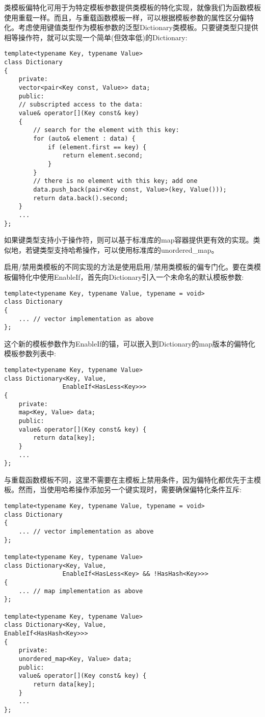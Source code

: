 
类模板偏特化可用于为特定模板参数提供类模板的特化实现，就像我们为函数模板使用重载一样。而且，与重载函数模板一样，可以根据模板参数的属性区分偏特化。考虑使用键值类型作为模板参数的泛型Dictionary类模板。只要键类型只提供相等操作符，就可以实现一个简单(但效率低)的Dictionary:

\begin{lstlisting}[style=styleCXX]
template<typename Key, typename Value>
class Dictionary
{
	private:
	vector<pair<Key const, Value>> data;
	public:
	// subscripted access to the data:
	value& operator[](Key const& key)
	{
		// search for the element with this key:
		for (auto& element : data) {
			if (element.first == key) {
				return element.second;
			}
		}
		// there is no element with this key; add one
		data.push_back(pair<Key const, Value>(key, Value()));
		return data.back().second;
	}
	...
};
\end{lstlisting}

如果键类型支持小于操作符，则可以基于标准库的map容器提供更有效的实现。类似地，若键类型支持哈希操作，可以使用标准库的unordered\_map。


启用/禁用类模板的不同实现的方法是使用启用/禁用类模板的偏专门化。要在类模板偏特化中使用EnableIf，首先向Dictionary引入一个未命名的默认模板参数:

\begin{lstlisting}[style=styleCXX]
template<typename Key, typename Value, typename = void>
class Dictionary
{
	... // vector implementation as above
};
\end{lstlisting}

这个新的模板参数作为EnableIf的锚，可以嵌入到Dictionary的map版本的偏特化模板参数列表中:

\begin{lstlisting}[style=styleCXX]
template<typename Key, typename Value>
class Dictionary<Key, Value,
				EnableIf<HasLess<Key>>>
{
	private:
	map<Key, Value> data;
	public:
	value& operator[](Key const& key) {
		return data[key];
	}
	...
};
\end{lstlisting}

与重载函数模板不同，这里不需要在主模板上禁用条件，因为偏特化都优先于主模板。然而，当使用哈希操作添加另一个键实现时，需要确保偏特化条件互斥:

\begin{lstlisting}[style=styleCXX]
template<typename Key, typename Value, typename = void>
class Dictionary
{
	... // vector implementation as above
};

template<typename Key, typename Value>
class Dictionary<Key, Value,
				EnableIf<HasLess<Key> && !HasHash<Key>>> 
{
	... // map implementation as above
};

template<typename Key, typename Value>
class Dictionary<Key, Value,
EnableIf<HasHash<Key>>>
{
	private:
	unordered_map<Key, Value> data;
	public:
	value& operator[](Key const& key) {
		return data[key];
	}
	...
};
\end{lstlisting}

